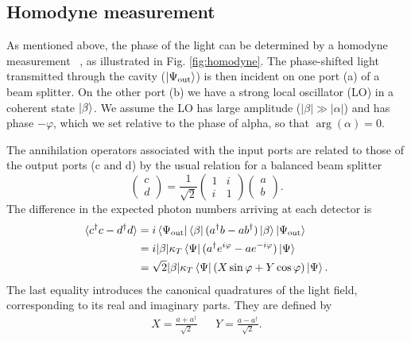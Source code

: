 \documentclass{article}
\begin{document}
\subsection{Homodyne measurement}

As mentioned above, the phase of the light can be determined by a homodyne
measurement ~\cite{agarwal2012}, as illustrated in Fig.
\ref{fig:homodyne}.
The phase-shifted light transmitted through the cavity
($\ket{\Psi_\text{out}}$)
is then incident on one port (a) of a
beam splitter. On the other port (b) we have a strong local oscillator (LO) in a
coherent state $\ket{\beta}$. We assume the LO has large amplitude ($|\beta|
\gg |\alpha|$) and has phase $-\varphi$, which we set relative to the phase of
alpha, so that $\arg(\alpha)=0$.

The annihilation operators associated with the
input ports are related to those of the output ports (c and d) by the usual
relation for a balanced beam splitter~\cite{agarwal2012}
%
\begin{equation}
  \begin{pmatrix} c \\ d \end{pmatrix} = \frac{1}{\sqrt{2}}\begin{pmatrix}
    1 & i \\ i & 1 
  \end{pmatrix}  \begin{pmatrix} a \\ b \end{pmatrix}.
\end{equation}
%
The difference in the expected photon numbers arriving at each
detector is
%
\begin{align}
  \langle c^\dagger c - d^\dagger d\rangle &= i
  \bra{\Psi_\text{out}}\bra{\beta}(a^\dagger b-
  ab^\dagger)\ket{\beta}\ket{\Psi_\text{out}} \\
  & = i|\beta|\kappa_T \bra{\Psi}(a^\dagger e^{i\varphi} - a
  e^{-i\varphi})\ket{\Psi} \\
  &= \sqrt{2}|\beta|\kappa_T\bra{\Psi}(X\sin\varphi +
  Y\cos\varphi)\ket{\Psi}.
\end{align}
%
The last equality introduces the canonical quadratures of the light field,
corresponding to its real and imaginary parts. They are defined by
%
\begin{align}
  X = \frac{a + a^\dagger}{\sqrt{2}} && Y = \frac{a - a^\dagger}{\sqrt{2}}.
\end{align}
\end{document}
